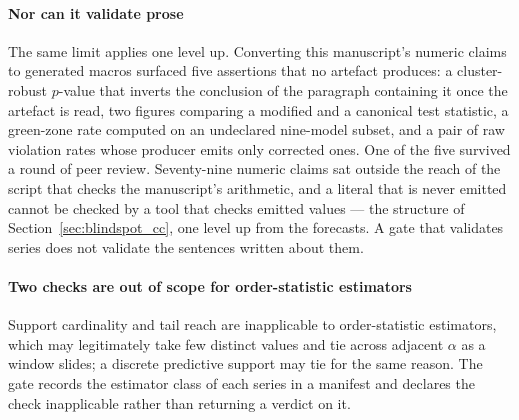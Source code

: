 \paragraph{Nor can it validate prose} The same limit applies one level up.
Converting this manuscript's numeric claims to generated macros surfaced five
assertions that no artefact produces: a cluster-robust $p$-value that inverts the
conclusion of the paragraph containing it once the artefact is read, two figures
comparing a modified and a canonical test statistic, a green-zone rate computed
on an undeclared nine-model subset, and a pair of raw violation rates whose
producer emits only corrected ones. One of the five survived a round of peer
review. Seventy-nine numeric claims sat outside the reach of the script that
checks the manuscript's arithmetic, and a literal that is never emitted cannot be
checked by a tool that checks emitted values --- the structure of
Section~\ref{sec:blindspot_cc}, one level up from the forecasts. A gate that
validates series does not validate the sentences written about them.

\paragraph{Two checks are out of scope for order-statistic estimators} Support cardinality and tail reach
are inapplicable to order-statistic estimators, which may legitimately take few
distinct values and tie across adjacent $\alpha$ as a window slides; a discrete
predictive support may tie for the same reason. The gate records the estimator class of each
series in a manifest and declares the check inapplicable rather than returning a
verdict on it.

